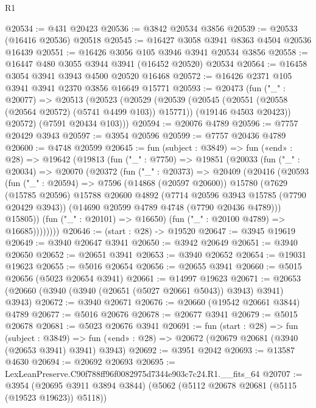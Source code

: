 \begin{lexlean}{R1}
\begin{coremodule}
@20534 := @431 @20423
@20536 := @3842 @20534 @3856
@20539 := @20533 (@16416 @20536) @20518
@20545 := @16427 @3058 @3941 @8363 @4504 @20536 @16439
@20551 := @16426 @3056 @105 @3946 @3941 @20534 @3856
@20558 := @16447 @480 @3055 @3944 @3941 (@16452 @20520) @20534
@20564 := @16458 @3054 @3941 @3943 @4500 @20520 @16468
@20572 := @16426 @2371 @105 @3941 @3941 @2370 @3856 @16649 @15771
@20593 := @20473
    (fun ("_" : @20077) =>
    @20513
      (@20523
        (@20529
          (@20539
            (@20545 (@20551 (@20558 (@20564 @20572) (@5741 @4499 @103)) @15771))
            (@19146 @4503 @20423))
          @20572)
        (@7591 @20434 @103)))
@20594 := @20076 @4789
@20596 := @7757 @20429 @3943
@20597 := @3954 @20596
@20599 := @7757 @20436 @4789
@20600 := @4748 @20599
@20645 := fun (subject : @3849) =>
  fun («end» : @28) =>
  @19642
    (@19813
      (fun ("_" : @7750) =>
      @19851
        (@20033
          (fun ("_" : @20034) =>
          @20070
            (@20372
              (fun ("_" : @20373) =>
              @20409
                (@20416
                  (@20593
                    (fun ("_" : @20594) =>
                    @7596
                      (@14868 (@20597 @20600))
                      @15780
                      (@7629
                        (@15785 @20596)
                        @15788
                        @20600
                        @4892
                        (@7714 @20596 @3943 @15785 (@7790 @20429 @3943))
                        (@14690 @20599 @4789 @4748 (@7790 @20436 @4789)))
                      @15805))
                  (fun ("_" : @20101) => @16650)
                  (fun ("_" : @20100 @4789) => @16685))))))))
@20646 := (start : @28) -> @19520
@20647 := @3945 @19619
@20649 := @3940 @20647 @3941
@20650 := @3942 @20649
@20651 := @3940 @20650
@20652 := @20651 @3941
@20653 := @3940 @20652
@20654 := @19031 @19623
@20655 := @5016 @20654
@20656 := @20655 @3941
@20660 := @5015 @20656 (@5023 @20654 @3941)
@20661 := @14997 @19623
@20671 := @20653 (@20660 (@3940 (@3940 (@20651 (@5027 @20661 @5043)) @3943) @3941) @3943)
@20672 := @3940 @20671
@20676 := @20660 (@19542 @20661 @3844) @4789
@20677 := @5016 @20676
@20678 := @20677 @3941
@20679 := @5015 @20678
@20681 := @5023 @20676 @3941
@20691 := fun (start : @28) =>
  fun (subject : @3849) =>
  fun («end» : @28) => @20672 (@20679 @20681 (@3940 (@20653 @3941) @3941) @3943)
@20692 := @3951 @2042
@20693 := @13587 @4630
@20694 := @20692 @20693
@20695 := LexLeanPreserve.C90f788ff96f0082975d7344e903c7c24.R1.__fits_64
@20707 := @3954
    (@20695 @3911 @3894 @3844)
    (@5062 (@5112 @20678 @20681 (@5115 (@19523 @19623)) @5118))

\end{coremodule}
\end{lexlean}
